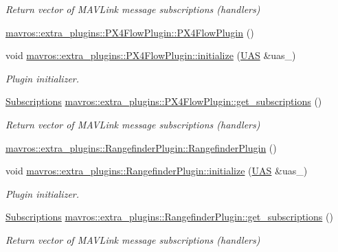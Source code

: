 \begin{DoxyCompactItemize}
\begin{DoxyCompactList}\small\item\em Return vector of M\+A\+V\+Link message subscriptions (handlers) \end{DoxyCompactList}\item 
\mbox{\hyperlink{group__plugin_ga865789c98ace44070bec3c1f9fdc6201}{mavros\+::extra\+\_\+plugins\+::\+P\+X4\+Flow\+Plugin\+::\+P\+X4\+Flow\+Plugin}} ()
\item 
void \mbox{\hyperlink{group__plugin_ga6b15368f120713a52cb776ad210a052b}{mavros\+::extra\+\_\+plugins\+::\+P\+X4\+Flow\+Plugin\+::initialize}} (\mbox{\hyperlink{classmavros_1_1UAS}{U\+AS}} \&uas\+\_\+)
\begin{DoxyCompactList}\small\item\em Plugin initializer. \end{DoxyCompactList}\item 
\mbox{\hyperlink{group__plugin_ga8967d61fc77040e0c3ea5a4585d62a09}{Subscriptions}} \mbox{\hyperlink{group__plugin_ga70d7cb3f7611e394d7a0d85ca5e2dcf5}{mavros\+::extra\+\_\+plugins\+::\+P\+X4\+Flow\+Plugin\+::get\+\_\+subscriptions}} ()
\begin{DoxyCompactList}\small\item\em Return vector of M\+A\+V\+Link message subscriptions (handlers) \end{DoxyCompactList}\item 
\mbox{\hyperlink{group__plugin_gab0a112620c3efe3757c993f0b2bfb9fa}{mavros\+::extra\+\_\+plugins\+::\+Rangefinder\+Plugin\+::\+Rangefinder\+Plugin}} ()
\item 
void \mbox{\hyperlink{group__plugin_gad13e24eaf9016887b2544eb816ab3327}{mavros\+::extra\+\_\+plugins\+::\+Rangefinder\+Plugin\+::initialize}} (\mbox{\hyperlink{classmavros_1_1UAS}{U\+AS}} \&uas\+\_\+)
\begin{DoxyCompactList}\small\item\em Plugin initializer. \end{DoxyCompactList}\item 
\mbox{\hyperlink{group__plugin_ga8967d61fc77040e0c3ea5a4585d62a09}{Subscriptions}} \mbox{\hyperlink{group__plugin_ga8911e15033c33875a44b518584464b81}{mavros\+::extra\+\_\+plugins\+::\+Rangefinder\+Plugin\+::get\+\_\+subscriptions}} ()
\begin{DoxyCompactList}\small\item\em Return vector of M\+A\+V\+Link message subscriptions (handlers) \end{DoxyCompactList}\item 

\end{DoxyCompactItemize}
